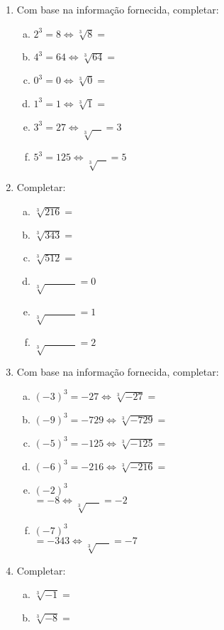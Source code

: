 \documentclass[a4paper,14pt]{article}
\begin{document}
\begin{multicols}{2}
\begin{enumerate}
		\item Com base na informação fornecida, completar:
		\begin{enumerate}[a)]
			\item $2^3 = 8 \Leftrightarrow \sqrt[3]{8} = $
			\item $4^3 = 64 \Leftrightarrow \sqrt[3]{64} = $
			\item $0^3 = 0 \Leftrightarrow \sqrt[3]{0} = $
			\item $1^3 = 1 \Leftrightarrow \sqrt[3]{1} = $
			\item $3^3 = 27 \Leftrightarrow \sqrt[3]{~~~~} = 3$
			\item $5^3 = 125 \Leftrightarrow \sqrt[3]{~~~~} = 5$
	    \end{enumerate}
    	\item Completar:
        \begin{enumerate}[a)]
        	\item $\sqrt[3]{216} = $
        	\item $\sqrt[3]{343} = $
        	\item $\sqrt[3]{512} = $
        	\item $\sqrt[3]{~~~~~~~~~~~~~~} = 0$
        	\item $\sqrt[3]{~~~~~~~~~~~~~~} = 1$
        	\item $\sqrt[3]{~~~~~~~~~~~~~~} = 2$        	
        \end{enumerate}
		\item Com base na informação fornecida, completar:
    	\begin{enumerate}[a)]
    		\item $(-3)^3 = -27 \Leftrightarrow \sqrt[3]{-27} = $
    		\item $(-9)^3 = -729 \Leftrightarrow \sqrt[3]{-729} = $
    		\item $(-5)^3 = -125 \Leftrightarrow \sqrt[3]{-125} = $
    		\item $(-6)^3 = -216 \Leftrightarrow \sqrt[3]{-216} = $
    		\item $(-2)^3$ \\ $= -8 \Leftrightarrow \sqrt[3]{~~~~~~} = -2$
    		\item $(-7)^3$ \\ $= -343 \Leftrightarrow \sqrt[3]{~~~~~~} = -7$
    	\end{enumerate}
        \item Completar:
        \begin{enumerate}[a)]
        	\item $\sqrt[3]{-1} = $
        	\item $\sqrt[3]{-8} = $

\end{enumerate}
\end{enumerate}
\end{multicols}
\end{document}
